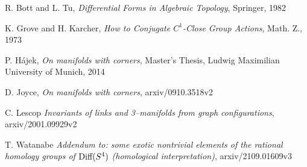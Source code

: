 \documentclass[11pt]{article}
\theoremstyle{definition}
\theoremstyle{remark}
\def\tn#1{\textnormal{#1}}
\begin{document}
\begin{thebibliography}{99}
 R. Bott and L. Tu, {\it Differential Forms in Algebraic Topology}, Springer, 1982

 K. Grove and H. Karcher, {\it How to Conjugate $C^1$-Close Group Actions}, Math. Z., 1973

 P. H\'ajek, {\it On manifolds with corners}, Master's Thesis, Ludwig Maximilian University of Munich, 2014

 D. Joyce, {\it On manifolds with corners}, arxiv/0910.3518v2

 C. Lescop {\it Invariants of links and 3–manifolds from graph configurations}, arxiv/2001.09929v2

 T. Watanabe {\it Addendum to: some exotic nontrivial elements of
the rational homology groups of $\tn{Diff}(S^4)$
(homological interpretation)}, arxiv/2109.01609v3
\end{thebibliography}
\end{document}
